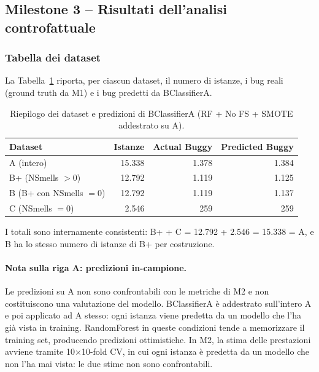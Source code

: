 \subsection{Milestone 3 -- Risultati dell'analisi controfattuale}

\subsubsection{Tabella dei dataset}

La Tabella~\ref{tab:whatif_datasets} riporta, per ciascun dataset, il numero di istanze,
i bug reali (ground truth da M1) e i bug predetti da BClassifierA.

\begin{table}[h]
\centering
\begin{tabular}{lrrr}
\toprule
\textbf{Dataset} & \textbf{Istanze} & \textbf{Actual Buggy} & \textbf{Predicted Buggy} \\
\midrule
A  (intero)              & 15.338 & 1.378 & 1.384 \\
B+ (NSmells $> 0$)       & 12.792 & 1.119 & 1.125 \\
B  (B+ con NSmells $= 0$) & 12.792 & 1.119 & 1.137 \\
C  (NSmells $= 0$)       &  2.546 &   259 &   259 \\
\bottomrule
\end{tabular}
\caption{Riepilogo dei dataset e predizioni di BClassifierA (RF + No FS + SMOTE addestrato su A).}
\label{tab:whatif_datasets}
\end{table}

I totali sono internamente consistenti: B+ + C = 12.792 + 2.546 = 15.338 = A, e B ha lo
stesso numero di istanze di B+ per costruzione.

\paragraph{Nota sulla riga A: predizioni in-campione.}
Le predizioni su A non sono confrontabili con le metriche di M2 e non costituiscono
una valutazione del modello. BClassifierA è addestrato sull'intero A e poi applicato
ad A stesso: ogni istanza viene predetta da un modello che l'ha già vista in training.
RandomForest in queste condizioni tende a memorizzare il training set, producendo
predizioni ottimistiche. In M2, la stima delle prestazioni avviene tramite 10$\times$10-fold
CV, in cui ogni istanza è predetta da un modello che non l'ha mai vista: le due stime
non sono confrontabili.

